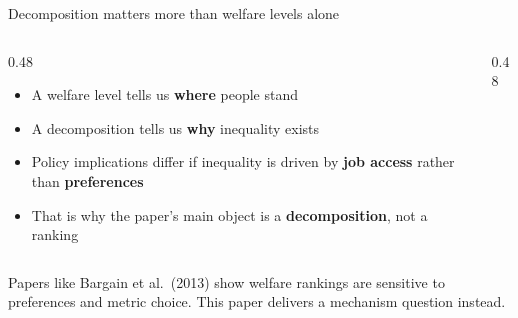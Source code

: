 \documentclass[aspectratio=169,11pt]{beamer}
\begin{document}
\begin{frame}{Decomposition matters more than welfare levels alone}

\begin{columns}[T]
\begin{column}{0.48\textwidth}
\begin{itemize}
\item A welfare level tells us \textbf{where} people stand
\item A decomposition tells us \textbf{why} inequality exists
\item Policy implications differ if inequality is driven by \textbf{job access} rather than \textbf{preferences}
\item That is why the paper's main object is a \textbf{decomposition}, not a ranking
\end{itemize}
\end{column}
\begin{column}{0.48\textwidth}
\centering
{}
\end{column}
\end{columns}

\vfill
\scriptsize\textcolor{cgrey}{Papers like Bargain et al.\ (2013) show welfare rankings are sensitive to preferences and metric choice. This paper delivers a mechanism question instead.}
\end{frame}
\end{document}
